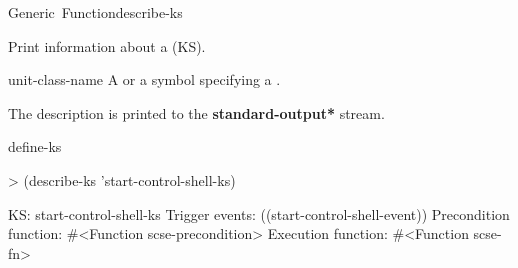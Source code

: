 \documentclass[10pt,twoside,english,pdftex]{article}
\begin{document}
\begin{functiondoc}{Generic~Function}{describe-ks}%
  {}
%
%

\fnsyntax

\fnpurpose
Print information about a  (KS).
 
\fnmethods
{}

\fnpackage {}

\fnmodule {}

\fnargs
\begin{args}{unit-class-name}
   A  or a symbol specifying a
  .
\end{args}

\fndescription
{}%
The description is printed to the {\bf *standard-output*} stream.

\begin{alsos}{define-ks}
\also[define-ks]
\also[ks]
\end{alsos}

\fnexample
\begin{example}
> (describe-ks 'start-control-shell-ks)

KS: start-control-shell-ks
  Trigger events:        ((start-control-shell-event))
  Precondition function: #<Function scse-precondition>
  Execution function:    #<Function scse-fn>
\end{example}

\end{functiondoc}

\end{document}
